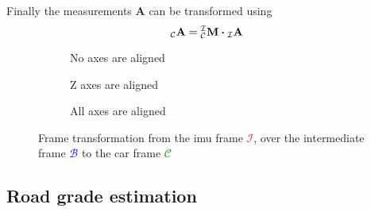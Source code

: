Finally the measurements $\mathbf{A}$ can be transformed using
\begin{equation}
	\vincs{A}{c} = \mtf{i}{c} \vdot \vincs{A}{i}
\end{equation}
\begin{figure}[htb]
	\centering
	\begin{subfigure}[b]{0.3\textwidth}
		\centering
		
		\caption{No axes are aligned}
		\label{fig:tikz_frame_transformation_init}
	\end{subfigure}
	\hfill
	\begin{subfigure}[b]{0.3\textwidth}
		\centering
		
		\caption{Z axes are aligned}
		\label{fig:tikz_frame_transformation_intermediate}
	\end{subfigure}
	\hfill
	\begin{subfigure}[b]{0.3\textwidth}
		\centering
		
		\caption{All axes are aligned}
		\label{fig:tikz_frame_transformation_final}
	\end{subfigure}
	\caption[Frame transformation]{Frame transformation from the \gls{imu} frame \textcolor{red}{$\mathcal{I}$}, over the intermediate frame \textcolor{blue}{$\mathcal{B}$} to the car frame \textcolor{green}{$\mathcal{C}$}}
	\label{fig:tikz_frame_transformation}
\end{figure}

\subsection{Road grade estimation}
